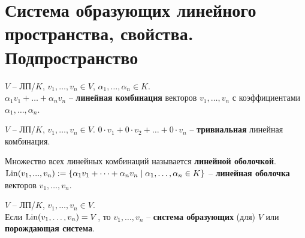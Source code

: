 
\section{Система образующих линейного пространства, свойства. Подпространство}

\begin{conj}
    $V$ -- ЛП/$K$, $v_1, \dots, v_n \in V$, 
    $\alpha_1, \dots, \alpha_n \in K$.\\
    $\alpha_1 v_1 + \dots + \alpha_n v_n $ -- \textbf{линейная комбинация}
    векторов $v_1, \dots, v_n$ с коэффициентами
    $\alpha_1, \dots, \alpha_n$.
\end{conj}

\begin{conj}
    $V$ -- ЛП/$K$, $v_1, \dots, v_n \in V$.
    $0 \cdot v_1 + 0 \cdot v_2 + \dots + 0 \cdot v_n$ -- 
    \textbf{тривиальная} линейная комбинация.
\end{conj}

\begin{conj}
    Множество всех линейных комбинаций называется 
    \textbf{линейной оболочкой}.\\
    $\operatorname{Lin}(v_1, ..., v_n) := 
    \{\alpha_1 v_1 + \dots + \alpha_n v_n \mid
    \alpha_1, \dots, \alpha_n \in K \}$ -- \textbf{линейная оболочка}
    векторов $v_1, \dots, v_n$.
\end{conj}

\begin{conj}
    $V$ -- ЛП/$K$, $v_1, \dots, v_n \in V$.\\
    Если $\operatorname{Lin}(v_1, \dots, v_n) = V$, то $v_1, \dots, v_n$ --
    \textbf{система образующих} (для) $V$ или \textbf{порождающая
    система}.
\end{conj}

